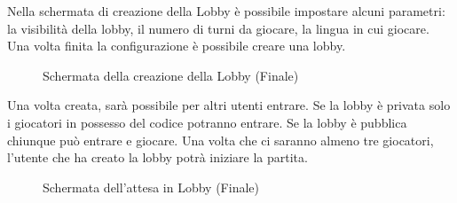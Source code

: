 \noindent Nella schermata di creazione della Lobby è possibile impostare alcuni parametri: la visibilità della lobby, il numero di turni da giocare, la lingua in cui giocare.\newline
Una volta finita la configurazione è possibile creare una lobby.

\begin{figure}[H]
    \caption{Schermata della creazione della Lobby (Finale)}
    \centering
    \label{fig:lobby_create_screen}
\end{figure}

\noindent Una volta creata, sarà possibile per altri utenti entrare. Se la lobby è privata solo i giocatori in possesso del codice potranno entrare. Se la lobby è pubblica chiunque può entrare e giocare. Una volta che ci saranno almeno tre giocatori, l'utente che ha creato la lobby potrà iniziare la partita.
\begin{figure}[H]
    \caption{Schermata dell'attesa in Lobby (Finale)}
    \centering
    \label{fig:in_lobby_screen}
\end{figure}

